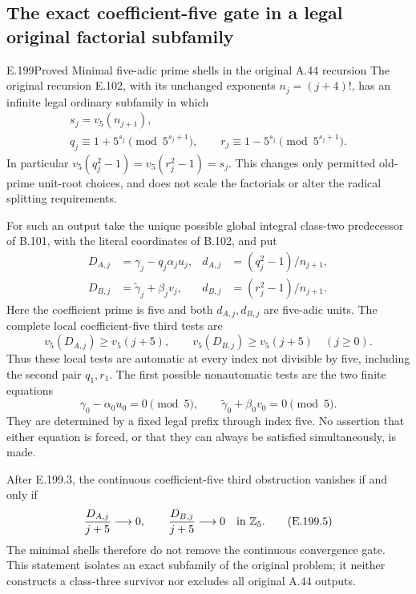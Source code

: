 \subsection{The exact coefficient-five gate in a legal original factorial subfamily}

\begin{result}{E.199}{Proved}
{Minimal five-adic prime shells in the original A.44 recursion}
The original recursion E.102, with its unchanged exponents
\(n_j=(j+4)!\), has an infinite legal ordinary subfamily in which
\[
 \begin{gathered}
 s_j=v_5(n_{j+1}),\\
 q_j\equiv1+5^{s_j}\pmod{5^{s_j+1}},\qquad
 r_j\equiv1-5^{s_j}\pmod{5^{s_j+1}}.
 \end{gathered}
\tag{E.199.1}
\]
In particular \(v_5(q_j^2-1)=v_5(r_j^2-1)=s_j\).
This changes only permitted old-prime unit-root choices, and does not
scale the factorials or alter the radical splitting requirements.

For such an output take the unique possible global integral class-two
predecessor of B.101, with the literal coordinates of B.102, and put
\[
 \begin{aligned}
 D_{A,j}&=\gamma_j-q_j\alpha_j u_j,&
 d_{A,j}&=(q_j^2-1)/n_{j+1},\\
 D_{B,j}&=\widetilde\gamma_j+\beta_jv_j,&
 d_{B,j}&=(r_j^2-1)/n_{j+1}.
 \end{aligned}
\tag{E.199.2}
\]
Here the coefficient prime is five and both \(d_{A,j},d_{B,j}\) are
five-adic units.  The complete local coefficient-five third tests are
\[
       v_5(D_{A,j})\geq v_5(j+5),\qquad
       v_5(D_{B,j})\geq v_5(j+5)\quad(j\geq0).
\tag{E.199.3}
\]
Thus these local tests are automatic at every index not divisible by
five, including the second pair \(q_1,r_1\).  The first possible
nonautomatic tests are the two finite equations
\[
 \gamma_0-\alpha_0u_0=0\pmod5,\qquad
 \widetilde\gamma_0+\beta_0v_0=0\pmod5.
\tag{E.199.4}
\]
They are determined by a fixed legal prefix through index five.
No assertion that either equation is forced, or that they can always
be satisfied simultaneously, is made.

After E.199.3, the continuous coefficient-five third obstruction
vanishes if and only if
\[
 \frac{D_{A,j}}{j+5}\longrightarrow0,\qquad
 \frac{D_{B,j}}{j+5}\longrightarrow0
                    \quad\hbox{in }\mathbb Z_5.
\tag{E.199.5}
\]
The minimal shells therefore do not remove the continuous convergence
gate.  This statement isolates an exact subfamily of the original
problem; it neither constructs a class-three survivor nor excludes
all original A.44 outputs.
\end{result}

